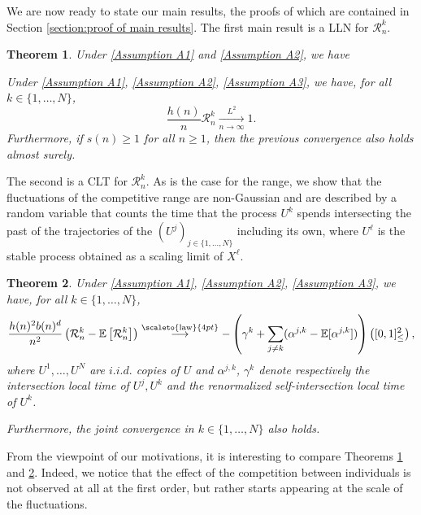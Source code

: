 \documentclass[12pt]{article}
\newcommand{\R}{\mathcal R}
\newcommand{\EE}{\mathbb E}
\newcommand{\1}{\mathds{1}}
\newcommand{\distribution}{\stackrel{\scaleto{\mathrm{law}}{4pt}}{\longrightarrow}}
\newtheorem{theorem}{Theorem}
\numberwithin{equation}{section}
\begin{document}
We are now ready to state our main results, the proofs of which are contained in Section \ref{section:proof of main results}. The first main result is a LLN for $\R_n^k$.
\begin{theorem}
    \label{theorem:LLN}
    Under \ref{Assumption A1} and \ref{Assumption A2}, we have 
    
    Under \ref{Assumption A1}, \ref{Assumption A2}, \ref{Assumption A3}, we have, for all $k\in\{1,\dots,N\}$,
    \begin{equation*}
        \frac{h(n)}{n}\R_n^k\underset{n\rightarrow\infty}{\overset{L^2}\longrightarrow}1.
    \end{equation*}
    Furthermore, if $s(n)\ge1$ for all $n\ge1$, then the previous convergence also holds almost surely.
\end{theorem}
The second is a CLT for $\R_n^k$. As is the case for the range, we show that the fluctuations of the competitive range are non-Gaussian and are described by a random variable that counts the time that the process $U^k$  spends intersecting the past of the trajectories of the $(U^j)_{j\in\{1,\dots,N\}}$ including its own, where $U^\ell$ is the stable process obtained as a scaling limit of $X^\ell$.

\begin{theorem}
Under \ref{Assumption A1}, \ref{Assumption A2}, \ref{Assumption A3}, we have, for all $k\in\{1,\dots,N\}$,
\label{theorem:CLT}
    \begin{equation*}
    \frac{h(n)^2b(n)^d}{n^2}\left(\R_n^k-\EE\left[\R_n^k\right]\right)\distribution -\left(\gamma^k+\sum_{j\ne k} (\alpha^{j,k}-\EE[\alpha^{j,k}])\right)\left([0,1]_\le^2\right),
\end{equation*}
where $U^1,\dots,U^N$ are $i.i.d.$ copies of $U$ and $\alpha^{j,k}$, $\gamma^k$ denote respectively the intersection local time of $U^j,U^k$ and the renormalized self-intersection local time of $U^k$.

Furthermore, the joint convergence in $k\in\{1,\dots,N\}$ also holds.
\end{theorem}
From the viewpoint of our motivations, it is interesting to compare Theorems \ref{theorem:LLN} and \ref{theorem:CLT}. Indeed, we notice that the effect of the competition between individuals is not observed at all at the first order, but rather starts appearing at the scale of the fluctuations.
\end{document}
